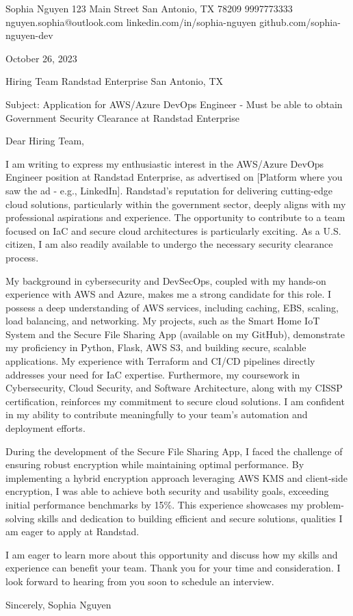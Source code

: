 \documentclass[
]{article}
\author{}
\date{}
\begin{document}
Sophia Nguyen 123 Main Street San Antonio, TX 78209 9997773333
nguyen.sophia@outlook.com linkedin.com/in/sophia-nguyen
github.com/sophia-nguyen-dev

October 26, 2023

Hiring Team Randstad Enterprise San Antonio, TX

Subject: Application for AWS/Azure DevOps Engineer - Must be able to
obtain Government Security Clearance at Randstad Enterprise

Dear Hiring Team,

I am writing to express my enthusiastic interest in the AWS/Azure DevOps
Engineer position at Randstad Enterprise, as advertised on {[}Platform
where you saw the ad - e.g., LinkedIn{]}. Randstad's reputation for
delivering cutting-edge cloud solutions, particularly within the
government sector, deeply aligns with my professional aspirations and
experience. The opportunity to contribute to a team focused on IaC and
secure cloud architectures is particularly exciting. As a U.S. citizen,
I am also readily available to undergo the necessary security clearance
process.

My background in cybersecurity and DevSecOps, coupled with my hands-on
experience with AWS and Azure, makes me a strong candidate for this
role. I possess a deep understanding of AWS services, including caching,
EBS, scaling, load balancing, and networking. My projects, such as the
Smart Home IoT System and the Secure File Sharing App (available on my
GitHub), demonstrate my proficiency in Python, Flask, AWS S3, and
building secure, scalable applications. My experience with Terraform and
CI/CD pipelines directly addresses your need for IaC expertise.
Furthermore, my coursework in Cybersecurity, Cloud Security, and
Software Architecture, along with my CISSP certification, reinforces my
commitment to secure cloud solutions. I am confident in my ability to
contribute meaningfully to your team's automation and deployment
efforts.

During the development of the Secure File Sharing App, I faced the
challenge of ensuring robust encryption while maintaining optimal
performance. By implementing a hybrid encryption approach leveraging AWS
KMS and client-side encryption, I was able to achieve both security and
usability goals, exceeding initial performance benchmarks by 15\%. This
experience showcases my problem-solving skills and dedication to
building efficient and secure solutions, qualities I am eager to apply
at Randstad.

I am eager to learn more about this opportunity and discuss how my
skills and experience can benefit your team. Thank you for your time and
consideration. I look forward to hearing from you soon to schedule an
interview.

Sincerely, Sophia Nguyen
\end{document}
